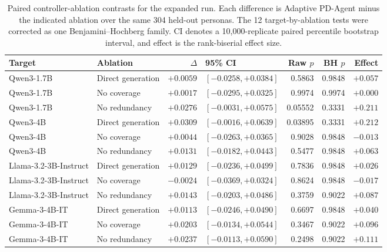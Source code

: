 \documentclass{ieeeaccess}
\begin{document}
\renewcommand{\thetable}{S9}
\begin{table}[H]
\centering
\footnotesize
\setlength{\tabcolsep}{3pt}
\caption{Paired controller-ablation contrasts for the expanded run. Each difference is
Adaptive PD-Agent minus the indicated ablation over the same 304 held-out personas. The 12
target-by-ablation tests were corrected as one Benjamini--Hochberg family. CI denotes a
10,000-replicate paired percentile bootstrap interval, and effect is the rank-biserial effect
size.}
\label{tab:controller-ablation-tests}
\begin{tabularx}{\textwidth}{l l r X r r r}
\toprule
Target & Ablation & $\Delta$ & 95\% CI & Raw $p$ & BH $p$ & Effect \\
\midrule
Qwen3-1.7B & Direct generation & $+0.0059$ & $[-0.0258,+0.0384]$ & 0.5863 & 0.9848 & $+0.057$ \\
Qwen3-1.7B & No coverage & $+0.0017$ & $[-0.0295,+0.0325]$ & 0.9974 & 0.9974 & $+0.000$ \\
Qwen3-1.7B & No redundancy & $+0.0276$ & $[-0.0031,+0.0575]$ & 0.05552 & 0.3331 & $+0.211$ \\
Qwen3-4B & Direct generation & $+0.0309$ & $[-0.0016,+0.0639]$ & 0.03895 & 0.3331 & $+0.212$ \\
Qwen3-4B & No coverage & $+0.0044$ & $[-0.0263,+0.0365]$ & 0.9028 & 0.9848 & $-0.013$ \\
Qwen3-4B & No redundancy & $+0.0131$ & $[-0.0182,+0.0443]$ & 0.5477 & 0.9848 & $+0.063$ \\
Llama-3.2-3B-Instruct & Direct generation & $+0.0129$ & $[-0.0236,+0.0499]$ & 0.7836 & 0.9848 & $+0.026$ \\
Llama-3.2-3B-Instruct & No coverage & $-0.0024$ & $[-0.0369,+0.0324]$ & 0.8624 & 0.9848 & $-0.017$ \\
Llama-3.2-3B-Instruct & No redundancy & $+0.0143$ & $[-0.0203,+0.0486]$ & 0.3759 & 0.9022 & $+0.087$ \\
Gemma-3-4B-IT & Direct generation & $+0.0113$ & $[-0.0246,+0.0490]$ & 0.6697 & 0.9848 & $+0.040$ \\
Gemma-3-4B-IT & No coverage & $+0.0203$ & $[-0.0134,+0.0544]$ & 0.3467 & 0.9022 & $+0.096$ \\
Gemma-3-4B-IT & No redundancy & $+0.0237$ & $[-0.0113,+0.0590]$ & 0.2498 & 0.9022 & $+0.111$ \\
\bottomrule
\end{tabularx}
\end{table}
\end{document}
